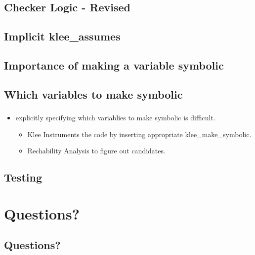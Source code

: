 \documentclass[mathserif,10pt]{beamer}
\newcommand{\cmt}[1]{}
\begin{document}
\subsection{Checker Logic - Revised}
\frame
{
  \frametitle{\subsecname}
  \algoCheckerIII
}

\subsection{Implicit klee\_assumes}
\frame
{
  \frametitle{\subsecname}
  \lstII
    \cmt{
    Without the klee_assume, the dereference z->x may get resolved to many
      spurious memory objects. But while dealing with pointer analysis results
      we assume that the index of gptr is within bounds and as a result we are
      getting false positives that (The set of allocation sites corresponding
          to the memory object of the load address, z->x) is NOT a subset of
      (Points to allocation sites for the load address z->x) 
    }

}

\subsection{Importance of making a variable symbolic}
\frame
{
  \frametitle{\subsecname}
  \lstI
  \cmt{
    Rather that explicitly making the  inputs of the test program
      symbolic, let klee instrument the code by inserting klee_make_symbolic
      calls. The inputs that we are considering include command line arguments,
      file inputs, globals and variables used to read inputs (for example using
          scanf).
  }

}

\subsection{Which variables to make symbolic}
\frame
{
  \frametitle{\subsecname}
  \begin{itemize}
    \item explicitly specifying which variablies to make symbolic is difficult. 
    \begin{itemize}
      \item Klee Instruments the code by inserting appropriate klee\_make\_symbolic.
      \item Rechability Analysis to figure out candidates.
    \end{itemize}
  \end{itemize}

}


\subsection{Testing}
\frame
{
  \frametitle{\subsecname}

}

\section{Questions?}
\subsection{Questions?}
\frame
{}
\end{document}

